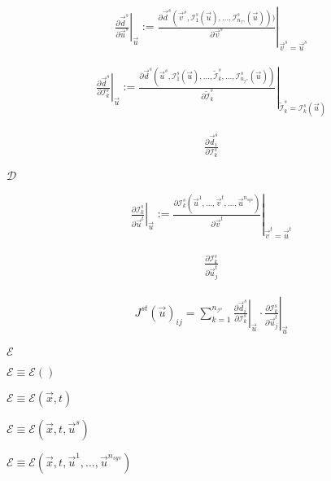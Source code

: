 \documentclass{article}
\begin{document}
\begin{align*} \left. \frac{\partial \vec{d}^s}{\partial \vec{u}^s} \right|_{\vec{u}} := \left. \frac{\partial \vec{d}^s(\vec{v}^s, \mathcal{I}^s_1(\vec{u}), \dots, \mathcal{I}^s_{n_{\mathcal{I}^s}}(\vec{u})))} {\partial \vec{v}^s} \right|_{\vec{v}^s = \vec{u}^s} \end{align*}
\pagebreak

\begin{align*} \left. \frac{\partial \vec{d}^s}{\partial \mathcal{I}^s_k} \right|_{\vec{u}} := \left. \frac{\partial \vec{d}^s(\vec{u}^s, \mathcal{I}^s_1(\vec{u}), \dots, \tilde{\mathcal{I}}^s_k, \dots, \mathcal{I}^s_{n_{\mathcal{I}^s}}(\vec{u}))} {\partial \tilde{\mathcal{I}}^s_k} \right|_{\tilde{\mathcal{I}}^s_k = \mathcal{I}^s_k(\vec{u})} \end{align*}
\pagebreak

\begin{align*} \frac{\partial \vec{d}^s_i}{\partial \mathcal{I}^s_k} \end{align*}
\pagebreak

$\mathcal{D}$
\pagebreak

\begin{align*} \left. \frac{\partial \mathcal{I}^s_k} {\partial \vec{u}^t} \right|_{\vec{u}} := \left. \frac{\partial \mathcal{I}^s_k(\vec{u}^1, \dots, \vec{v}^t, \dots, \vec{u}^{n_{sys}})} {\partial \vec{v}^t} \right|_{\vec{v}^t = \vec{u}^t} \end{align*}
\pagebreak

\begin{align*} \frac{\partial \mathcal{I}^s_k}{\partial \vec{u}^t_j} \end{align*}
\pagebreak

\begin{align*} J^{st}(\vec{u})_{ij} = \sum_{k=1}^{n_{\mathcal{I}^s}} \left. \frac{\partial \vec{d}^s_i}{\partial \mathcal{I}^s_k} \right|_{\vec{u}} \cdot \left. \frac{\partial \mathcal{I}^s_k} {\partial \vec{u}^t_j} \right|_{\vec{u}} \end{align*}
\pagebreak

$\mathcal{E}$
\pagebreak

$ \mathcal{E} \equiv \mathcal{E}()$
\pagebreak

$ \mathcal{E} \equiv \mathcal{E}(\vec{x},t)$
\pagebreak

$ \mathcal{E} \equiv \mathcal{E}(\vec{x}, t, \vec{u}^s)$
\pagebreak

$ \mathcal{E} \equiv \mathcal{E}(\vec{x}, t, \vec{u}^1, \dots, \vec{u}^{n_{sys}})$
\pagebreak
\end{document}
